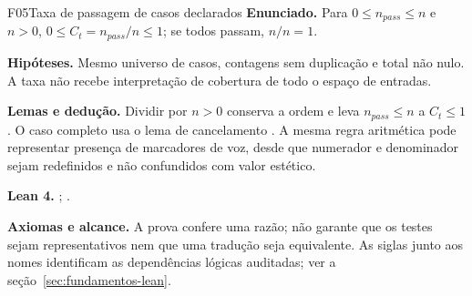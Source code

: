\begin{formalizacao}{F05}{Taxa de passagem de casos declarados}
\textbf{Enunciado.} Para $0\leq n_{pass}\leq n$ e $n>0$, $0\leq C_t=n_{pass}/n\leq1$; se todos passam, $n/n=1$.

\textbf{Hipóteses.} Mesmo universo de casos, contagens sem duplicação e total não nulo. A taxa não recebe interpretação de cobertura de todo o espaço de entradas.

\textbf{Lemas e dedução.} Dividir por $n>0$ conserva a ordem e leva $n_{pass}\leq n$ a $C_t\leq1$. O caso completo usa o lema de cancelamento . A mesma regra aritmética pode representar presença de marcadores de voz, desde que numerador e denominador sejam redefinidos e não confundidos com valor estético.

\textbf{Lean 4.} ; .

\textbf{Axiomas e alcance.} A prova confere uma razão; não garante que os testes sejam representativos nem que uma tradução seja equivalente. As siglas junto aos nomes identificam as dependências lógicas auditadas; ver a seção~\ref{sec:fundamentos-lean}.
\end{formalizacao}

